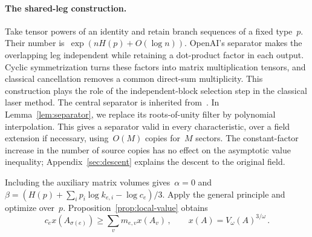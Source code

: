 \documentclass[11pt,letterpaper]{article}
\theoremstyle{definition}
\numberwithin{equation}{section}
\begin{document}
\paragraph{The shared-leg construction.}
Take tensor powers of an identity and retain branch sequences of a fixed type~$p$. Their number is~$\exp(nH(p)+O(\log n))$. OpenAI's separator makes the overlapping leg independent while retaining a dot-product factor in each output. Cyclic symmetrization turns these factors into matrix multiplication tensors, and classical cancellation removes a common direct-sum multiplicity. This construction plays the role of the independent-block selection step in the classical laser method. The central separator is inherited from~\cite{OpenAI}. In Lemma~\ref{lem:separator}, we replace its roots-of-unity filter by polynomial interpolation. This gives a separator valid in every characteristic, over a field extension if necessary, using~$O(M)$ copies for~$M$ sectors. The constant-factor increase in the number of source copies has no effect on the asymptotic value inequality; Appendix~\ref{sec:descent} explains the descent to the original field.

Including the auxiliary matrix volumes gives~$\alpha=0$ and~$\beta=(H(p)+\sum_i p_i\log k_{e,i}-\log c_e)/3$. Apply the general principle and optimize over~$p$. Proposition~\ref{prop:local-value} obtains
\begin{equation*}
 c_e x(A_{\sigma(e)})\geq\sum_v m_{e,v}x(A_v)\,,
 \qquad x(A)=V_\omega(A)^{3/\omega}\,.
\end{equation*}
\end{document}
